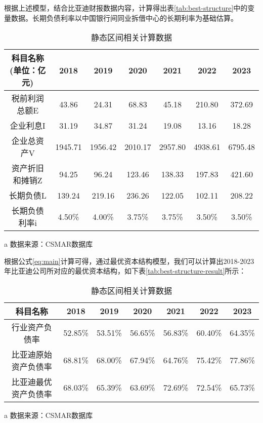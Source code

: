 根据上述模型，结合比亚迪财报数据内容，计算得出表\eqref{tab:best-structure}中的变量数据。长期负债利率以中国银行间同业拆借中心的长期利率为基础估算。 
\begin{table}
  \centering
  \begin{threeparttable}[c]
    \caption{静态区间相关计算数据}
    \label{tab:best-structure}
    \begin{tabular}{ccccccc}
      \toprule
        科目名称(单位：亿元) & 2018 & 2019 & 2020 & 2021 & 2022 & 2023 \\ 
      \midrule
        税前利润总额E & 43.86  & 24.31  & 68.83  & 45.18  & 210.80  & 372.69  \\ 
        企业利息I & 31.19  & 34.87  & 31.24  & 19.08  & 13.16  & 18.28  \\ 
        企业总资产V & 1945.71  & 1956.42  & 2010.17  & 2957.80  & 4938.61  & 6795.48  \\ 
        资产折旧和摊销Z & 94.25  & 96.24  & 123.46  & 138.33  & 197.83  & 421.60  \\ 
        长期负债L & 139.24  & 219.16  & 236.26  & 122.05  & 102.11  & 208.22  \\ 
        长期负债利率i & 4.50\% & 4.00\% & 3.75\% & 3.75\% & 3.50\% & 3.50\% \\ 
      \bottomrule
    \end{tabular}
    \begin{tablenotes}
      \item [a] 数据来源：CSMAR数据库
    \end{tablenotes}
  \end{threeparttable}
\end{table}
根据公式\eqref{eq:main}计算可得，通过最优资本结构模型，我们可以计算出2018-2023年比亚迪公司所对应的最优资本结构，如下表\eqref{tab:best-structure-result}所示：
\begin{table}
  \centering
  \begin{threeparttable}[c]
    \caption{静态区间相关计算数据}
    \label{tab:best-structure-result}
    \begin{tabular}{ccccccc}
      \toprule
        科目名称 & 2018 & 2019 & 2020 & 2021 & 2022 & 2023 \\ 
      \midrule
        行业资产负债率 & 52.85\% & 53.51\% & 56.65\% & 56.83\% & 60.40\% & 64.35\% \\ 
        比亚迪原始资产负债率 & 68.81\% & 68.00\% & 67.94\% & 64.76\% & 75.42\% & 77.86\% \\ 
        比亚迪最优资产负债率 & 68.03\% & 65.39\% & 63.69\% & 72.69\% & 72.54\% & 65.73\% \\ 
      \bottomrule
    \end{tabular}
    \begin{tablenotes}
      \item [a] 数据来源：CSMAR数据库
    \end{tablenotes}
  \end{threeparttable}
\end{table}

